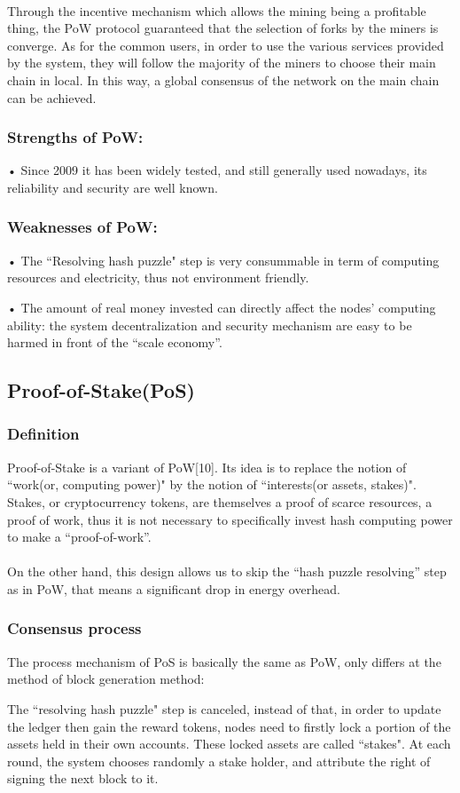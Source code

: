 \documentclass[doublespacing]{bmcart}
\begin{document}
\begin{CJK*}{UTF8}{gbsn}
    \paragraph{}
    Through the incentive mechanism which allows the mining being a profitable thing, the PoW protocol guaranteed that the selection of forks by the miners is converge. As for the common users, in order to use the various services provided by the system, they will follow the majority of the miners to choose their main chain in local. In this way, a global consensus of the network on the main chain can be achieved.
    \subsubsection*{Strengths of PoW:}
   • Since 2009 it has been widely tested, and still generally used nowadays, its reliability and security are well known.
	\subsubsection*{Weaknesses of PoW:}
    • The ``Resolving hash puzzle" step is very consummable in term of computing resources and electricity, thus not environment friendly.
\par • The amount of real money invested can directly affect the nodes’ computing ability: the system decentralization and security mechanism are easy to be harmed in front of the “scale economy”. 

	\subsection{Proof-of-Stake(PoS)} 
	\subsubsection*{Definition}
	Proof-of-Stake is a variant of PoW[10]. Its idea is to replace the notion of ``work(or, computing power)" by the notion of ``interests(or assets, stakes)". Stakes, or cryptocurrency tokens, are themselves a proof of scarce resources, a proof of work, thus it is not necessary to specifically invest hash computing power to make a ``proof-of-work''. 
	\paragraph{}
	On the other hand, this design allows us to skip the ``hash puzzle resolving'' step as in PoW, that means a significant drop in energy overhead.
	\subsubsection*{Consensus process}
	The process mechanism of PoS is basically the same as PoW, only differs at the method of block generation method: 
	\par The ``resolving hash puzzle" step is canceled, instead of that, in order to update the ledger then gain the reward tokens, nodes need to firstly lock a portion of the assets held in their own accounts. These locked assets are called ``stakes". At each round, the system chooses randomly a stake holder, and attribute the right of signing the next block to it. 

\end{CJK*}
\end{document}
